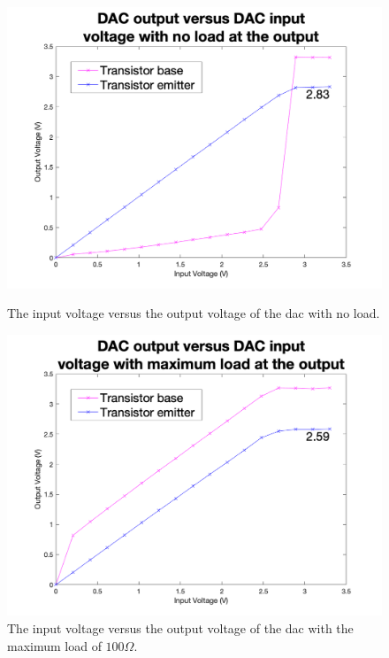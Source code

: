 \begin{figure}[ht]
    \centering
    \begin{minipage}{.5\textwidth}
        \centering
        \includegraphics[width=\textwidth]{Figures/Testing/DAC_no_load}
        \caption{The input voltage versus the output voltage of the \gls{dac} with no load.}
        \label{fig:dac-voltage-range-no-load} %
    \end{minipage}%
    \begin{minipage}{.5\textwidth}
        \centering
        \includegraphics[width=\textwidth]{Figures/Testing/DAC_loaded}
        \caption{The input voltage versus the output voltage of the \gls{dac} with the maximum load of $100\Omega$.}
        \label{fig:dac-voltage-range-loaded} %
    \end{minipage}
\end{figure}


